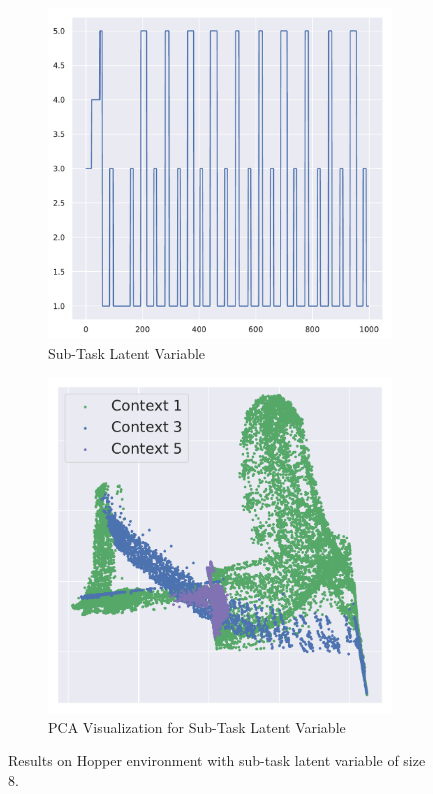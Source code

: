 \documentclass{article} %
\begin{document}
\begin{figure}
    \centering
    \begin{subfigure}{0.45\columnwidth}
    \centering
    \includegraphics[scale=0.3]{figures/hopper/context_8_plot.pdf}
    \caption{Sub-Task Latent Variable}
    \end{subfigure}%
    \centering
    \begin{subfigure}{0.45\columnwidth}
    \centering
    \includegraphics[scale=0.3]{figures/pca/context_8/pca_hopper_context_8_plot_3.pdf}
    \caption{PCA Visualization for Sub-Task Latent Variable}
    \end{subfigure}%
    \caption{Results on Hopper environment with sub-task latent variable of size 8.}
    \label{fig:hopper_context_8}
\end{figure}
\end{document}
